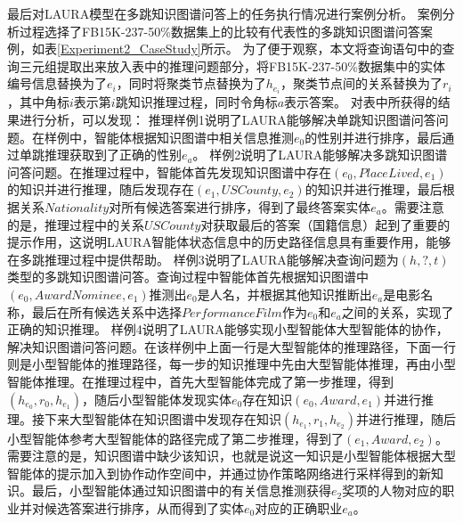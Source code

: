 \documentclass[algorithmlist, AutoFakeBold, AutoFakeSlant, figurelist, tablelist, nomlist, engineering]{seuthesix}
\begin{document}
最后对LAURA模型在多跳知识图谱问答上的任务执行情况进行案例分析。
案例分析过程选择了FB15K-237-50\%数据集上的比较有代表性的多跳知识图谱问答案例，如表\ref{Experiment2_CaseStudy}所示。
为了便于观察，本文将查询语句中的查询三元组提取出来放入表中的推理问题部分，将FB15K-237-50\%数据集中的实体编号信息替换为了$e_i$，同时将聚类节点替换为了$h_{e_i}$，聚类节点间的关系替换为了$r_i$，其中角标$i$表示第$i$跳知识推理过程，同时令角标$a$表示答案。
对表中所获得的结果进行分析，可以发现：
推理样例1说明了LAURA能够解决单跳知识图谱问答问题。在样例中，智能体根据知识图谱中相关信息推测$e_0$的性别并进行排序，最后通过单跳推理获取到了正确的性别$e_a$。
样例2说明了LAURA能够解决多跳知识图谱问答问题。在推理过程中，智能体首先发现知识图谱中存在$(e_0, PlaceLived, e_1)$的知识并进行推理，随后发现存在$(e_1, USCounty, e_2)$的知识并进行推理，最后根据关系$Nationality$对所有候选答案进行排序，得到了最终答案实体$e_a$。需要注意的是，推理过程中的关系$USCounty$对获取最后的答案（国籍信息）起到了重要的提示作用，这说明LAURA智能体状态信息中的历史路径信息具有重要作用，能够在多跳推理过程中提供帮助。
样例3说明了LAURA能够解决查询问题为$(h, ?, t)$类型的多跳知识图谱问答。查询过程中智能体首先根据知识图谱中$(e_0, AwardNominee, e_1)$推测出$e_0$是人名，并根据其他知识推断出$e_a$是电影名称，最后在所有候选关系中选择$PerformanceFilm$作为$e_0$和$e_a$之间的关系，实现了正确的知识推理。
样例4说明了LAURA能够实现小型智能体大型智能体的协作，解决知识图谱问答问题。在该样例中上面一行是大型智能体的推理路径，下面一行则是小型智能体的推理路径，每一步的知识推理中先由大型智能体推理，再由小型智能体推理。在推理过程中，首先大型智能体完成了第一步推理，得到$(h_{e_0}, r_0, h_{e_1})$，随后小型智能体发现实体$e_0$存在知识$(e_0, Award, e_1)$并进行推理。接下来大型智能体在知识图谱中发现存在知识$(h_{e_1}, r_1, h_{e_2})$并进行推理，随后小型智能体参考大型智能体的路径完成了第二步推理，得到了$(e_1, Award, e_2)$。需要注意的是，知识图谱中缺少该知识，也就是说这一知识是小型智能体根据大型智能体的提示加入到协作动作空间中，并通过协作策略网络进行采样得到的新知识。最后，小型智能体通过知识图谱中的有关信息推测获得$e_2$奖项的人物对应的职业并对候选答案进行排序，从而得到了实体$e_0$对应的正确职业$e_a$。
\end{document}
